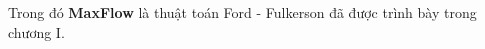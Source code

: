 


    


    
\BlankLine
Trong đó \textbf{MaxFlow} là thuật toán Ford - Fulkerson đã được trình bày trong chương I.